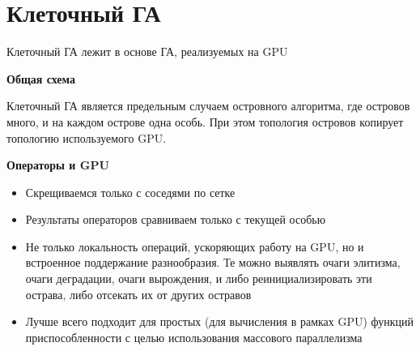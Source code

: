 \section{Клеточный ГА}
Клеточный ГА лежит в основе ГА, реализуемых на GPU

\textbf{Общая схема}

Клеточный ГА является предельным случаем островного алгоритма, где островов много, и на каждом острове одна особь. При этом топология островов копирует топологию используемого GPU. 

\textbf{Операторы и GPU}
\begin{itemize}
    \item Скрещиваемся только с соседями по сетке
    \item Результаты операторов сравниваем только с текущей особью
    \item  Не только локальность операций, ускоряющих работу на GPU, но и встроенное поддержание разнообразия. Те можно выявлять очаги элитизма, очаги деградации, очаги вырождения, и либо реинициализировать эти острава, либо отсекать их от других остравов
    \item Лучше всего подходит для простых (для вычисления в рамках GPU) функций приспособленности с целью использования массового параллелизма 
\end{itemize}